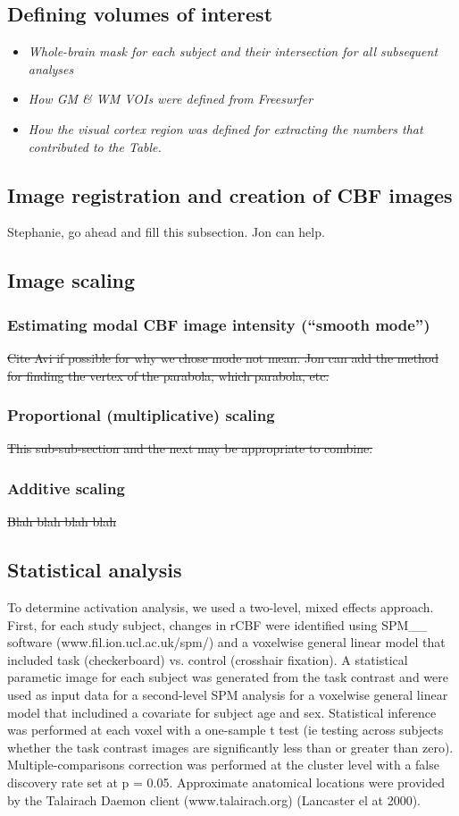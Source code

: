 \subsection{Defining volumes of interest}
\begin{itemize}
\item \textit{Whole-brain mask for each subject and their intersection for all subsequent analyses}
\item \textit{How GM & WM VOIs were defined from Freesurfer}
\item \textit{How the visual cortex region was defined for extracting the numbers that contributed to the Table.}
\end{itemize}

\subsection{Image registration and creation of CBF images}
Stephanie, go ahead and fill this subsection. Jon can help.

\subsection{Image scaling}
\subsubsection{Estimating modal CBF image intensity (``smooth mode'')}
\sout{Cite Avi if possible for why we chose mode not mean. Jon can add the method for finding the vertex of the parabola, which parabola, etc.} 
\subsubsection{Proportional (multiplicative) scaling}
\sout{This sub-sub-section and the next may be appropriate to combine.}
\subsubsection{Additive scaling}
\sout{Blah blah blah blah}

\subsection{Statistical analysis}
To determine activation analysis, we used a two-level, mixed effects approach.  First, for each study subject, changes in rCBF were identified using SPM__ software (www.fil.ion.ucl.ac.uk/spm/) and a voxelwise general linear model that included task (checkerboard) vs. control (crosshair fixation). A statistical parametic image for each subject was generated from the task contrast and were used as input data for a second-level SPM analysis for a voxelwise general linear model that includined a covariate for subject age and sex. Statistical inference was performed at each voxel with a one-sample t test (ie testing across subjects whether the task contrast images are significantly less than or greater than zero). Multiple-comparisons correction was performed at the cluster level with a false discovery rate set at p = 0.05. Approximate anatomical locations were provided by the Talairach Daemon client (www.talairach.org) (Lancaster el at 2000). 

